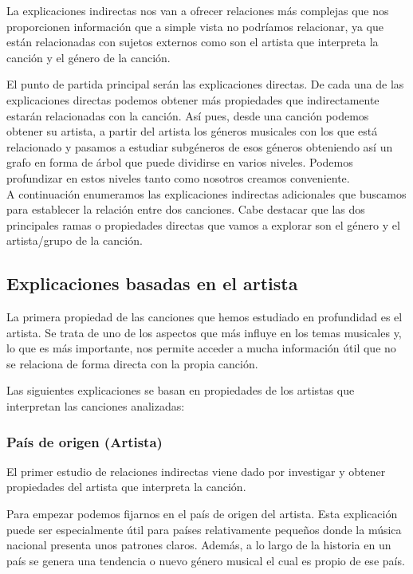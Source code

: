 La explicaciones indirectas nos van a ofrecer relaciones más complejas que nos proporcionen información que a simple vista no podríamos relacionar, ya que están relacionadas con sujetos externos como son el artista que interpreta la canción y el género de la canción.

El punto de partida principal serán las explicaciones directas. De cada una de las explicaciones directas podemos obtener más propiedades que indirectamente estarán relacionadas con la canción. Así pues, desde una canción podemos obtener su artista, a partir del artista los géneros musicales con los que está relacionado y pasamos a estudiar subgéneros de esos géneros obteniendo así un grafo en forma de árbol que puede dividirse en varios niveles. Podemos profundizar en estos niveles tanto como nosotros creamos conveniente. \\

A continuación enumeramos las explicaciones indirectas adicionales que buscamos para establecer la relación entre dos canciones. Cabe destacar que las dos principales ramas o propiedades directas que vamos a explorar son el género y el artista/grupo de la canción.

\subsection{Explicaciones basadas en el artista}

La primera propiedad de las canciones que hemos estudiado en profundidad es el artista. Se trata de uno de los aspectos que más influye en los temas musicales y, lo que es más importante, nos permite acceder a mucha información útil que no se relaciona de forma directa con la propia canción.

Las siguientes explicaciones se basan en propiedades de los artistas que interpretan las canciones analizadas:

\subsubsection*{País de origen (Artista)}

El primer estudio de relaciones indirectas viene dado por investigar y obtener propiedades del artista que interpreta la canción.

Para empezar podemos fijarnos en el país de origen del artista. Esta explicación puede ser especialmente útil para países relativamente pequeños donde la música nacional presenta unos patrones claros. Además, a lo largo de la historia en un país se genera una tendencia o nuevo género musical el cual es propio de ese país.


